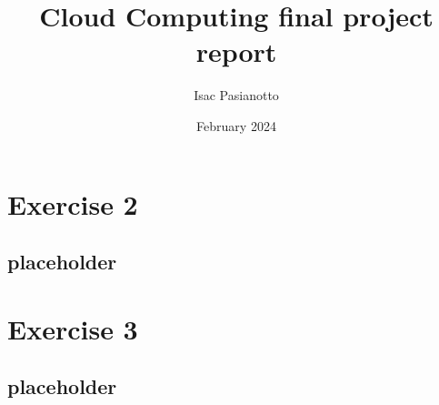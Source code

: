 \documentclass[a4paper]{article}
\begin{document}
\title{Cloud Computing final project report}
\author{Isac Pasianotto}
\date{February 2024}
\maketitle
\tableofcontents
\newpage



\newpage

\section{Exercise 2}

\subsection{placeholder}

\section{Exercise 3}

\subsection{placeholder}
\end{document}
